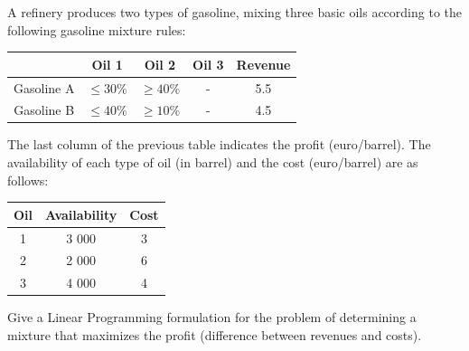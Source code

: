 \documentclass[12pt, a4paper]{report}
\newtheorem[style=M,bodystyle=\normalfont]{theorem}{Theorem}
\newtheorem[style=M,bodystyle=\normalfont]{corollary}{Corollary}
\newtheorem[style=M,bodystyle=\normalfont]{lemma}{Lemma}
\newtheorem[style=M,bodystyle=\normalfont]{definition}{Definition}
\begin{document}
\newpage

\begin{Exercise}[label=2]
    A refinery produces two types of gasoline, mixing three basic oils according to the following gasoline mixture rules:
    \begin{table}[H]
        \centering
        \begin{tabular}{c|ccc|c|}
        \cline{2-5}
        \textbf{}                        & \textbf{Oil 1} & \textbf{Oil 2} & \textbf{Oil 3} & \textbf{Revenue} \\ \hline
        \multicolumn{1}{|c|}{Gasoline A} & $\leq 30\%$    & $\geq 40\%$    & -              & 5.5              \\
        \multicolumn{1}{|c|}{Gasoline B} & $\leq 40\%$    & $\geq 10\%$    & -              & 4.5              \\ \hline
        \end{tabular}
    \end{table}
    The last column of the previous table indicates the profit (euro/barrel). The availability of each type of oil (in barrel) and the cost (euro/barrel) are as follows:
    \begin{table}[H]
        \centering
        \begin{tabular}{c|c|c}
        \textbf{Oil} & \textbf{Availability} & \textbf{Cost} \\ \hline
        1            & 3 000                 & 3             \\
        2            & 2 000                 & 6             \\
        3            & 4 000                 & 4            
        \end{tabular}
    \end{table}
    Give a Linear Programming formulation for the problem of determining a mixture that maximizes the profit (difference between revenues and costs).
\end{Exercise}
\end{document}
